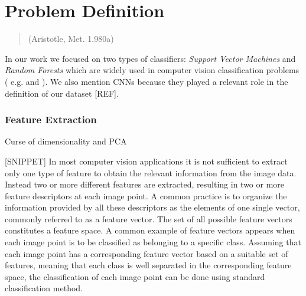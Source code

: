 \chapter{Problem Definition}
\label{chapter3}
\thispagestyle{empty}

\begin{quotation}
{\footnotesize
{}
\begin{flushright}
(Aristotle, Met. 1.980a)
\end{flushright}
}
\end{quotation}

\vspace{0.5cm}



In our work we focused on two types of classifiers: \textit{Support Vector Machines} and \textit{Random Forests}
which are widely used in computer vision classification problems ( e.g. \cite{mitosisDetectionLearningBased} and \cite{randForests04}).
We also mention \Glspl{CNN} because they played a relevant role in the definition of our dataset [REF].


 

\subsection{Feature Extraction}

Curse of dimensionality and PCA




[SNIPPET]
In most computer vision applications it is not sufficient to extract only one type of feature to obtain the relevant information from the image data.
Instead two or more different features are extracted, resulting in two or more feature descriptors at each image point.
A common practice is to organize the information provided by all these descriptors as the elements of one single vector,
commonly referred to as a feature vector. The set of all possible feature vectors constitutes a feature space.
A common example of feature vectors appears when each image point is to be classified as belonging to a specific class.
Assuming that each image point has a corresponding feature vector based on a suitable set of features,
meaning that each class is well separated in the corresponding feature space, the classification of each image point can be done using standard classification method.














